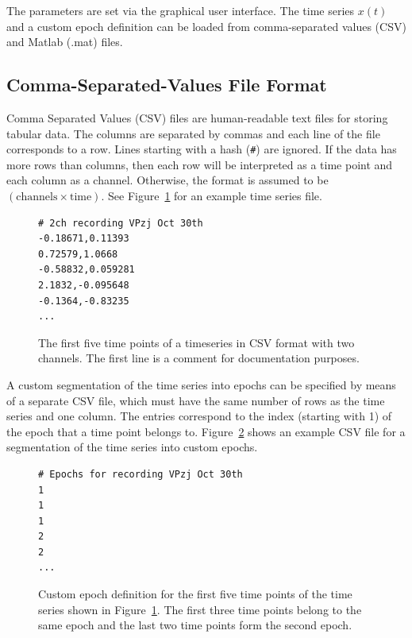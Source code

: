 \documentclass{article}
\newcommand{\1}{\ensuremath{\mathds{1}}}
\newcommand{\0}{\ensuremath{0}}
\begin{document}
The parameters are set via the graphical user interface. The time series 
$x(t)$ and a custom epoch definition can be loaded from comma-separated values
(CSV) and Matlab (.mat) files.

\subsection{Comma-Separated-Values File Format}
\label{sec:csv_input}

Comma Separated Values (CSV) files are human-readable text files for storing tabular data. 
The columns are separated by commas and each line of the file corresponds to a row. 
Lines starting with a hash (\texttt{\#}) are ignored. If the data has more rows than columns,
then each row will be interpreted as a time point and each column as a channel. Otherwise,
the format is assumed to be $(\text{channels} \times \text{time})$. See 
Figure~\ref{fig:ex_timeseries} for an example time series file. 

\begin{figure}[h]
\centering
\begin{boxedminipage}{10cm}
\begin{verbatim}
# 2ch recording VPzj Oct 30th
-0.18671,0.11393
0.72579,1.0668
-0.58832,0.059281
2.1832,-0.095648
-0.1364,-0.83235
...
\end{verbatim}
\end{boxedminipage}
\caption{
The first five time points of a timeseries in CSV format with two channels. 
The first line is a comment for documentation purposes.
\label{fig:ex_timeseries}
}
\end{figure}

A custom segmentation of the time series into epochs can be specified by means of 
a separate CSV file, which must have the same number of rows as the time series 
and one column. The entries correspond to the index (starting with 1) of the 
epoch that a time point belongs to. Figure~\ref{fig:ex_segmentation} shows 
an example CSV file for a segmentation of the time series into custom epochs. 

\begin{figure}[h]
\centering
\begin{boxedminipage}{10cm}
\begin{verbatim}
# Epochs for recording VPzj Oct 30th
1
1
1
2
2
...
\end{verbatim}
\end{boxedminipage}
\caption{
Custom epoch definition for the first five time points of the time series shown in Figure~\ref{fig:ex_timeseries}. 
The first three time points belong to the same epoch and the last two time points form the second epoch.
\label{fig:ex_segmentation}
}
\end{figure}
\end{document}
